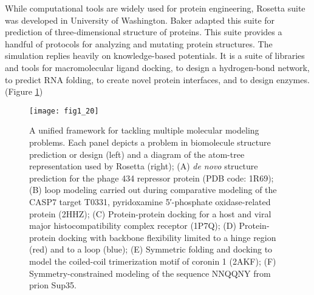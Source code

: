 \begin{refsection}
While computational tools are widely used for protein
engineering\cite{Rothlisberger2008,DiMaio2011a,Korkegian2005,
Leaver-Fay2013a,Leaver-Fay2011,Drew2013a,Kaufmann2010,Rohl2004}, Rosetta suite
was developed in University of Washington. Baker  adapted this
suite for prediction of three-dimensional structure of
proteins\cite{Leaver-Fay2011}. This suite provides a handful of protocols for
analyzing and mutating protein structures.  The simulation replies heavily on
knowledge-based potentials. It is a suite of libraries and tools for
macromolecular ligand docking\cite{Willcox2003}, to design a hydrogen-bond
network\cite{Rohl2004}, to predict RNA folding\cite{Das2007,Egli2002}, to
create novel protein interfaces\cite{Jiang2008,Hennig2002}, and to design
enzymes\cite{Ashworth2006a}. (Figure \ref{fig:rosetta-overview})
\begin{figure}[h!] \centering \texttt{[image: fig1\_20]}
    \caption[A unified framework for tackling multiple molecular modeling
        problems. Each panel depicts a problem in biomolecule structure
        prediction or design (left) and a diagram of the atom-tree
        representation used by Rosetta (right); (A) \emph{de novo} structure
        prediction for the phage 434 repressor protein (PDB code: 1R69); (B)
        loop modeling carried out during comparative modeling of the CASP7
        target T0331, pyridoxamine 5′-phosphate oxidase-related protein (2HHZ);
        (C) Protein-protein docking for a host and viral major
        histocompatibility complex receptor (1P7Q); (D) Protein-protein docking
        with backbone flexibility limited to a hinge region (red) and to a loop
        (blue); (E) Symmetric folding and docking to model the coiled-coil
        trimerization motif of coronin 1 (2AKF); (F) Symmetry-constrained
        modeling of the sequence NNQQNY from prion Sup35] {A unified framework
            for tackling multiple molecular modeling problems. Each panel
            depicts a problem in biomolecule structure prediction or design
            (left) and a diagram of the atom-tree representation used by
            Rosetta (right); (A) \emph{de novo} structure prediction for the
            phage 434 repressor protein (PDB code: 1R69); (B) loop modeling
            carried out during comparative modeling of the CASP7 target T0331,
            pyridoxamine 5′-phosphate oxidase-related protein (2HHZ); (C)
            Protein-protein docking for a host and viral major
            histocompatibility complex receptor (1P7Q); (D) Protein-protein
            docking with backbone flexibility limited to a hinge region (red)
            and to a loop (blue); (E) Symmetric folding and docking to model
            the coiled-coil trimerization motif of coronin 1 (2AKF); (F)
            Symmetry-constrained modeling of the sequence NNQQNY from prion
            Sup35\cite{Das2008}.} 
        \label{fig:rosetta-overview} 
\end{figure}


\end{refsection}
